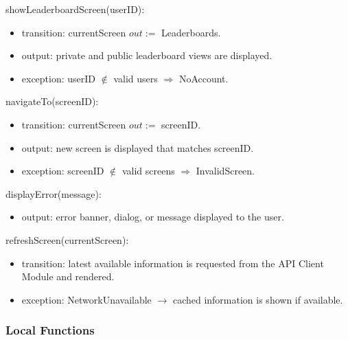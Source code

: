 \documentclass[12pt, titlepage]{article}
\begin{document}
\noindent showLeaderboardScreen(userID):
\begin{itemize}
\item transition: currentScreen $\mathit{out} :=$ Leaderboards.
\item output: private and public leaderboard views are displayed.
\item exception: userID $\notin$ valid users $\Rightarrow$ NoAccount.
\end{itemize}

\noindent navigateTo(screenID):
\begin{itemize}
\item transition: currentScreen $\mathit{out} :=$ screenID.
\item output: new screen is displayed that matches screenID.
\item exception: screenID $\notin$ valid screens $\Rightarrow$ InvalidScreen.
\end{itemize}

\noindent displayError(message):
\begin{itemize}
\item output: error banner, dialog, or message displayed to the user.
\end{itemize}

\noindent refreshScreen(currentScreen):
\begin{itemize}
\item transition: latest available information is requested from the API Client Module and rendered.
\item exception: NetworkUnavailable $\rightarrow$ cached information is shown if available.
\end{itemize}

\subsubsection{Local Functions}
\end{document}
